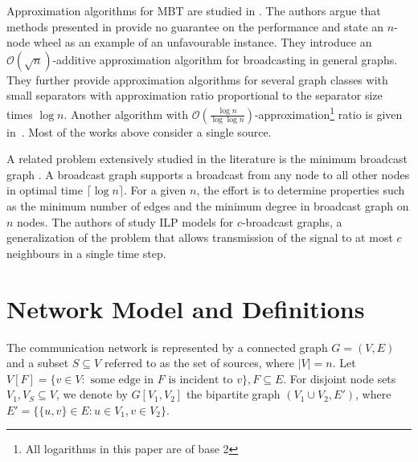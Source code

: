 Approximation algorithms for MBT are studied in \cite{kortsarz95}. 
The authors argue that methods presented in \cite{scheuermann84} provide no guarantee on the performance and state an $n$-node wheel as an example of an unfavourable instance.
They introduce an $\mathcal{O}(\sqrt{n})$-additive approximation algorithm for broadcasting in general graphs.
They further provide approximation algorithms for several graph classes with small separators with approximation ratio proportional to the separator size times $\log n$.
Another algorithm with $\mathcal{O}\left(\frac{\log n}{\log \log n}\right)$-approximation\footnote{All logarithms in this paper are of base 2} ratio is given in~\cite{elkin03}.
Most of the works above consider a single source.

A related problem extensively studied in the literature is the minimum broadcast graph \cite{grigni91,mcgarvey16}. 
A broadcast graph supports a broadcast from any node to all other nodes in optimal time $\lceil\log n\rceil$.
For a given $n$, the effort is to determine properties such as the minimum number of edges and the minimum degree in broadcast graph on $n$ nodes.
The authors of \cite{mcgarvey16} study ILP models for $c$-broadcast graphs, a generalization of the problem that allows transmission of the signal to at most $c$ neighbours in a single time step.

\section{Network Model and Definitions}

The communication network is represented by a connected graph $G=(V,E)$ and a subset $S\subseteq V$ referred to as the set of sources, where $|V|=n$. 
Let $V\left[F\right]=\{v\in V:\text{ some edge in } F \text{ is incident to } v\}, F\subseteq E$.
For disjoint node sets $V_1,V_S\subseteq V$, we denote by $G\left[V_1,V_2\right]$ the bipartite graph $(V_1\cup V_2,E')$, where  $E'=\{\{u,v\}\in E: u\in V_1,v\in V_2\}$. 

